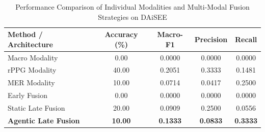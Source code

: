 \begin{table}[htbp]
\centering
\caption{Performance Comparison of Individual Modalities and Multi-Modal Fusion Strategies on DAiSEE}
\label{tab:engagement_results}
\begin{tabular}{lcccc}
\hline
\textbf{Method / Architecture} & \textbf{Accuracy (\%)} & \textbf{Macro-F1} & \textbf{Precision} & \textbf{Recall} \\
\hline
Macro Modality & 0.00 & 0.0000 & 0.0000 & 0.0000 \\
rPPG Modality & 40.00 & 0.2051 & 0.3333 & 0.1481 \\
MER Modality & 10.00 & 0.0714 & 0.0417 & 0.2500 \\
Early Fusion & 0.00 & 0.0000 & 0.0000 & 0.0000 \\
Static Late Fusion & 20.00 & 0.0909 & 0.2500 & 0.0556 \\
\textbf{Agentic Late Fusion} & \textbf{10.00} & \textbf{0.1333} & \textbf{0.0833} & \textbf{0.3333} \\
\hline
\end{tabular}
\end{table}
